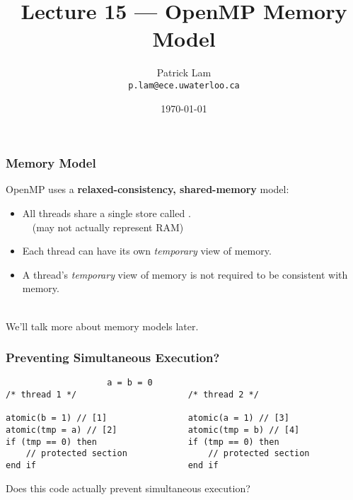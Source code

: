 

\title{Lecture 15 --- OpenMP Memory Model }

\author{Patrick Lam \\ \small \texttt{p.lam@ece.uwaterloo.ca}}
\date{\today}




\begin{frame}
  \titlepage

 \end{frame}

\begin{frame}
  \frametitle{Memory Model}

  

  OpenMP uses a {\bf relaxed-consistency, shared-memory} model:

  \begin{itemize}
    \item All threads share a single store called
      .\\ ~~(may not actually represent RAM)\\[1em]
    \item Each thread can have its own {\it temporary} view of memory.\\[1em]
    \item A thread's {\it temporary} view of memory is not required to be
      consistent with memory.
  \end{itemize}~\\

  We'll talk more about memory models later.
  
\end{frame}

\begin{frame}[fragile]
  \frametitle{Preventing Simultaneous Execution?}

  \begin{lstlisting}
                    a = b = 0
/* thread 1 */                      /* thread 2 */

atomic(b = 1) // [1]                atomic(a = 1) // [3]
atomic(tmp = a) // [2]              atomic(tmp = b) // [4]
if (tmp == 0) then                  if (tmp == 0) then
    // protected section                // protected section
end if                              end if
  \end{lstlisting}

  
 Does this code actually prevent simultaneous execution?
  
\end{frame}

